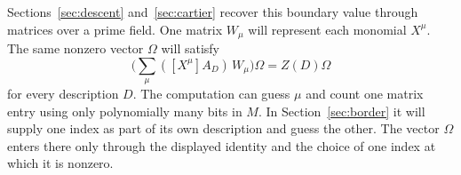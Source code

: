 Sections~\ref{sec:descent} and~\ref{sec:cartier} recover this boundary
value through matrices over a prime field. One matrix $W_\mu$ will
represent each monomial $X^\mu$. The same nonzero vector $\Omega$ will
satisfy
\[
 \biggl(\sum_\mu ([X^\mu]A_D)\,W_\mu\biggr)\Omega=Z(D)\Omega
\]
for every description $D$. The computation can guess $\mu$ and count
one matrix entry using only polynomially many bits in $M$. In
Section~\ref{sec:border} it will supply one index as part of its own
description and guess the other. The vector $\Omega$ enters there
only through the displayed identity and the choice of one index at
which it is nonzero.

